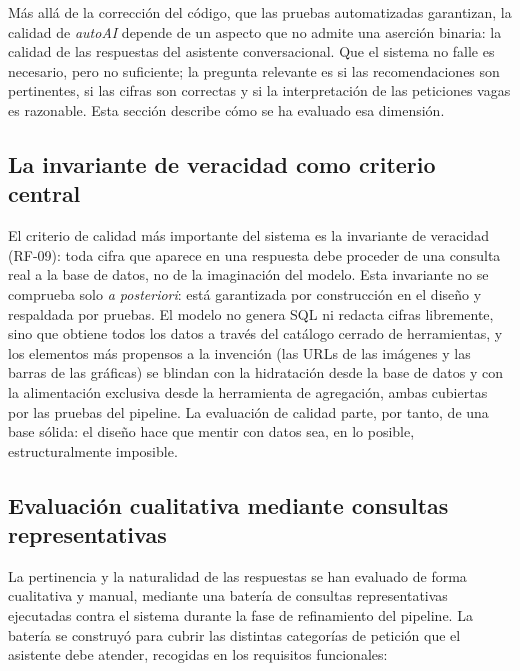 Más allá de la corrección del código, que las pruebas automatizadas garantizan,
la calidad de \emph{autoAI} depende de un aspecto que no admite una aserción
binaria: la calidad de las respuestas del asistente conversacional. Que el
sistema no falle es necesario, pero no suficiente; la pregunta relevante es si
las recomendaciones son pertinentes, si las cifras son correctas y si la
interpretación de las peticiones vagas es razonable. Esta sección describe cómo
se ha evaluado esa dimensión.

\subsection{La invariante de veracidad como criterio central}
\label{sec:test-veracidad}

El criterio de calidad más importante del sistema es la invariante de veracidad
(RF-09): toda cifra que aparece en una respuesta debe proceder de una consulta
real a la base de datos, no de la imaginación del modelo. Esta invariante no se
comprueba solo \emph{a posteriori}: está garantizada por construcción en el
diseño y respaldada por pruebas. El modelo no genera SQL ni redacta cifras
libremente, sino que obtiene todos los datos a través del catálogo cerrado de
herramientas, y los elementos más propensos a la invención (las URLs de las
imágenes y las barras de las gráficas) se blindan con la hidratación desde la base
de datos y con la alimentación exclusiva desde la herramienta de agregación, ambas
cubiertas por las pruebas del pipeline. La evaluación de calidad parte, por tanto,
de una base sólida: el diseño hace que mentir con datos sea, en lo posible,
estructuralmente imposible.

\subsection{Evaluación cualitativa mediante consultas representativas}
\label{sec:test-cualitativa}

La pertinencia y la naturalidad de las respuestas se han evaluado de forma
cualitativa y manual, mediante una batería de consultas representativas
ejecutadas contra el sistema durante la fase de refinamiento del pipeline. La
batería se construyó para cubrir las distintas categorías de petición que el
asistente debe atender, recogidas en los requisitos funcionales:


